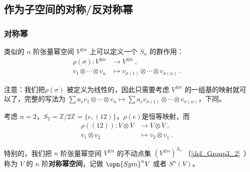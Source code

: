 
\begin{issues}
\end{issues}


\subsection{作为子空间的对称/反对称幂}\label{sub_vecSAS_1}

\subsubsection{对称幂}


类似的 $n$ 阶张量幂空间 $V^{\otimes n}$ 上可以定义一个 $S_n$ 的群作用：
\begin{equation}
\begin{aligned}
\rho(\sigma): V^{\otimes n} &\to V^{\otimes n}~, \\
v_1 \otimes \cdots \otimes v_n &\mapsto v_{\sigma(1)} \otimes \cdots \otimes v_{\sigma(n)}~.
\end{aligned}
\end{equation}


注意：我们把$\rho(\sigma)$ 被定义为线性的，因此只需要考虑 $V^{\otimes n}$ 的一组基的映射就可以了，完整的写法为 $\sum a_v v_1 \otimes \cdots \otimes v_n \mapsto \sum a_v v_{\sigma(1)} \otimes \cdots \otimes v_{\sigma(n)}$，下同。

\begin{example}{}
考虑 $n = 2$，$S_2 = \mathbb{Z}/2\mathbb{Z} = \{e, (1 2)\}$，$\rho(e)$是恒等映射，而
\begin{equation}
\begin{aligned}
\rho((1 2)): V \otimes V &\to V \otimes V~, \\
v_1 \otimes v_2 &\mapsto v_2 \otimes v_1~.
\end{aligned}
\end{equation}
\end{example}

特别的，我们把 $n$ 阶张量幂空间 $V^{\otimes n}$ 的不动点集 $(V^{\otimes n})^{S_n}$ （\autoref{def_Group3_2}~）称为 $V$ 的 $n$ 阶\textbf{对称幂空间}，记做 $\opn{Sym}^n V$ 或者 $S^n(V)$。

